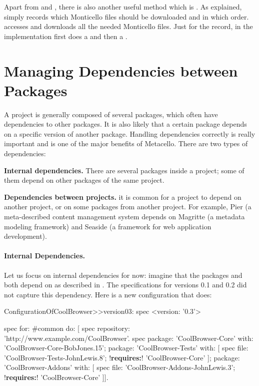 \documentclass[a4paper,10pt,twoside]{book}
\begin{document}
Apart from  and , there is also another useful method  which is . As explained,  simply records which Monticello files should be downloaded and in which order.   accesses and downloads all the needed Monticello files. Just for the record, in the implementation  first does a  and then a . 

\section{Managing Dependencies between Packages}

A project is generally composed of several packages, which often have dependencies to other packages.  It is also likely that a certain package depends on a specific version of another package. Handling dependencies correctly is really important and  is one of the major benefits of Metacello. There are two types of dependencies:
\begin{description}
\item \textbf{Internal dependencies.} There are several packages inside a project; some of them depend on other packages of the same project. 
\item \textbf{Dependencies between projects.} it is common for a project to depend on another project, or on some packages from another project. 
For example, Pier (a meta-described content management system depends on Magritte (a metadata modeling framework) and Seaside (a framework for web application development).
\end{description}



\paragraph{Internal Dependencies.} Let us focus on internal dependencies for now: imagine that the packages  and  both depend on  as described in . The specifications for versions 0.1 and 0.2 did not capture this dependency. Here is a new configuration that does:

\begin{code}{}
ConfigurationOfCoolBrowser>>version03: spec 
       <version: '0.3'>
       
       spec for: #common do: [
              spec repository: 'http://www.example.com/CoolBrowser'.
              spec 
                     package: 'CoolBrowser-Core' with: 'CoolBrowser-Core-BobJones.15';
                     package: 'CoolBrowser-Tests' with: [
                            spec 
                                   file: 'CoolBrowser-Tests-JohnLewis.8';
                                   !\textbf{requires:}! 'CoolBrowser-Core' ];
                     package: 'CoolBrowser-Addons' with: [
                            spec 
                                   file: 'CoolBrowser-Addons-JohnLewis.3';
                                   !\textbf{requires:}! 'CoolBrowser-Core' ]].
\end{code}
\end{document}
